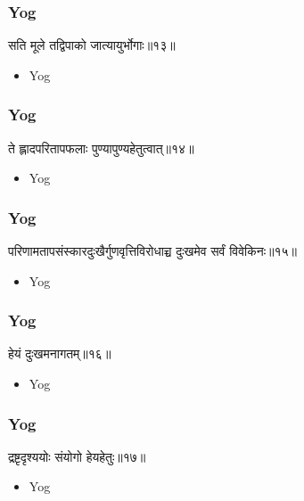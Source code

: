 \begin{frame}[fragile]\frametitle{Yog}
\begin{sanskrit}
सति मूले तद्विपाको जात्यायुर्भोगाः॥१३॥
\end{sanskrit}
	\begin{itemize}
	\item Yog 
	\end{itemize}
\end{frame}


\begin{frame}[fragile]\frametitle{Yog}
\begin{sanskrit}
ते ह्लादपरितापफलाः पुण्यापुण्यहेतुत्वात्॥१४॥
\end{sanskrit}
	\begin{itemize}
	\item Yog 
	\end{itemize}
\end{frame}


\begin{frame}[fragile]\frametitle{Yog}
\begin{sanskrit}
परिणामतापसंस्कारदुःखैर्गुणवृत्तिविरोधाच्च दुःखमेव सर्वं विवेकिनः॥१५॥
\end{sanskrit}
	\begin{itemize}
	\item Yog 
	\end{itemize}
\end{frame}


\begin{frame}[fragile]\frametitle{Yog}
\begin{sanskrit}
हेयं दुःखमनागतम्॥१६॥
\end{sanskrit}
	\begin{itemize}
	\item Yog 
	\end{itemize}
\end{frame}


\begin{frame}[fragile]\frametitle{Yog}
\begin{sanskrit}
द्रष्टृदृश्ययोः संयोगो हेयहेतुः॥१७॥
\end{sanskrit}
	\begin{itemize}
	\item Yog 
	\end{itemize}
\end{frame}

